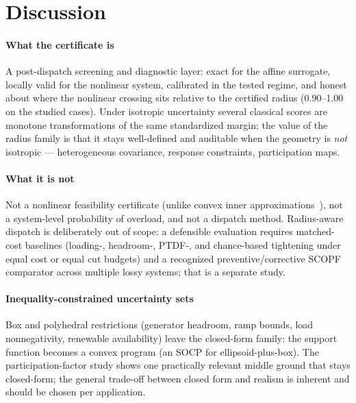 \documentclass[11pt]{article}
\begin{document}


\section{Discussion}
\label{sec:discussion}

\paragraph{What the certificate is}
A post-dispatch screening and diagnostic layer: exact for the affine
surrogate, locally valid for the nonlinear system, calibrated in the tested
regime, and honest about where the nonlinear crossing sits relative to the
certified radius (0.90--1.00 on the studied cases).  Under isotropic
uncertainty several classical scores are monotone transformations of the
same standardized margin; the value of the radius family is that it stays
well-defined and auditable when the geometry is \emph{not} isotropic ---
heterogeneous covariance, response constraints, participation maps.

\paragraph{What it is not}
Not a nonlinear feasibility certificate (unlike convex inner
approximations~\citep{NguyenDvijothamTuritsyn2019}), not a system-level
probability of overload, and not a dispatch method.  Radius-aware dispatch
is deliberately out of scope: a defensible evaluation requires matched-cost
baselines (loading-, headroom-, PTDF-, and chance-based tightening under
equal cost or equal cut budgets) and a recognized preventive/corrective
SCOPF comparator across multiple lossy systems; that is a separate study.

\paragraph{Inequality-constrained uncertainty sets}
Box and polyhedral restrictions (generator headroom, ramp bounds, load
nonnegativity, renewable availability) leave the closed-form family: the
support function becomes a convex program (an SOCP for ellipsoid-plus-box).
The participation-factor study shows one practically relevant middle ground
that stays closed-form; the general trade-off between closed form and
realism is inherent and should be chosen per application.
\end{document}
